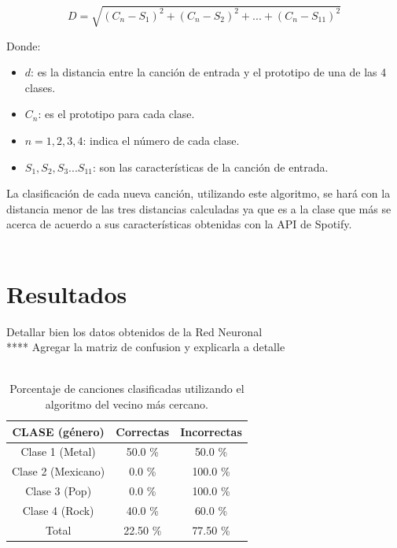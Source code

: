 \documentclass[conference]{IEEEtran}
\begin{document}
\begin{equation}
	D = \sqrt{ (C_n - S_{1} )^2 + (C_n - S_{2} )^2 + ... + (C_n - S_{11} )^2 }
\end{equation}

Donde:\\
\begin{itemize}
	\item $d$: es la distancia entre la canción de entrada y el prototipo de una de las 4 clases.
	\item $C_n$: es el prototipo para cada clase.
	\item $n = 1, 2, 3, 4$: indica el número de cada clase.
	\item $S_{1}, S_{2}, S_{3} ... S_{11}$: son las características de la canción de entrada. \\
\end{itemize}

La clasificación de cada nueva canción, utilizando este algoritmo, se hará con la distancia menor de las tres distancias calculadas ya que es a la clase que más se acerca de acuerdo a sus características obtenidas con la API de Spotify.\\\\

\section{Resultados}

Detallar bien los datos obtenidos de la Red Neuronal \\

**** Agregar la matriz de confusion y explicarla a detalle \\\\

\begin{table}[h]
\renewcommand{\arraystretch}{1.3}
\renewcommand{\tablename}{Tabla}
\caption{ Porcentaje de canciones clasificadas utilizando el algoritmo del vecino más cercano. }
\label{table_example}
\centering
\begin{tabular}{|c|c|c|}
\hline
CLASE (género) & Correctas & Incorrectas \\
\hline
Clase 1 (Metal) & 50.0 \% & 50.0 \% \\
\hline
Clase 2 (Mexicano) & 0.0 \% & 100.0 \% \\
\hline
Clase 3 (Pop) & 0.0 \% & 100.0 \% \\
\hline
Clase 4 (Rock) & 40.0 \% & 60.0 \% \\
\hline
Total & 22.50 \% & 77.50 \% \\
\hline
\end{tabular}
\end{table}
\end{document}
